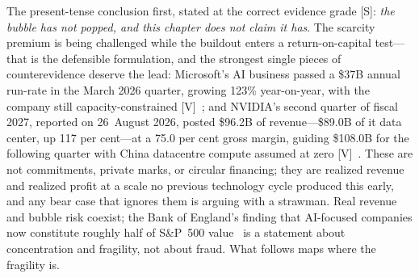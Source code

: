 The present-tense conclusion first, stated at the correct evidence grade [S]: \emph{the bubble has not popped, and this chapter does not claim it has}. The scarcity premium is being challenged while the buildout enters a return-on-capital test---that is the defensible formulation, and the strongest single pieces of counterevidence deserve the lead: Microsoft's AI business passed a \$37B annual run-rate in the March 2026 quarter, growing 123\% year-on-year, with the company still capacity-constrained [V]~\cite{msft-q3,microsoft2026}; and NVIDIA's second quarter of fiscal 2027, reported on 26~August 2026, posted \$96.2B of revenue---\$89.0B of it data center, up 117 per cent---at a 75.0 per cent gross margin, guiding \$108.0B for the following quarter with China datacentre compute assumed at zero [V]~\cite{nvidia2026,nvda-q2fy27}. These are not commitments, private marks, or circular financing; they are realized revenue and realized profit at a scale no previous technology cycle produced this early, and any bear case that ignores them is arguing with a strawman. Real revenue and bubble risk coexist; the Bank of England's finding that AI-focused companies now constitute roughly half of S\&P~500 value~\cite{boe} is a statement about concentration and fragility, not about fraud. What follows maps where the fragility is.

